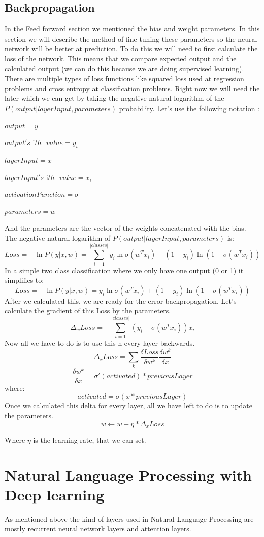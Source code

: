 \subsection{Backpropagation}
In the Feed forward section we mentioned the bias and weight parameters. In this section we will describe the method of fine tuning these parameters so the neural network will be better at prediction.
To do this we will need to first calculate the loss of the network. This means that we compare expected output and the calculated output (we can do this because we are doing supervised learning). There are multiple types of loss functions like squared loss used at regression problems and cross entropy at classification problems. Right now we will need the later which we can get by taking the negative natural logarithm of the \(P(output|layerInput, parameters)\) probability.
Let's use the following notation :

\(output = y\)

\(output's \text{ i}th \text{ } value = y_i\)

\(layerInput = x\)

\(layerInput's \text{ i}th \text{ } value = x_i\)

\(activationFunction = \sigma\)

\(parameters = w\)

And the parameters are the vector of the weights concatenated with the bias.
The negative natural logarithm of \(P(output|layerInput, parameters)\) is:
\[Loss = -\ln P(y|x, w) = \sum_{i=1}^{|classes|}y_i\ln \sigma(w^Tx_i)+(1 - y_i)\ln (1 - \sigma(w^Tx_i))\]
In a simple two class classification where we only have one output (0 or 1) it simplifies to:
\[Loss = -\ln P(y|x, w) = y_i\ln \sigma(w^Tx_i)+(1 - y_i)\ln (1 - \sigma(w^Tx_i))\]
After we calculated this, we are ready for the error backpropagation. Let's calculate the gradient of this Loss by the parameters.
\[\Delta_w Loss = -\sum_{i=1}^{|classes|}(y_i - \sigma(w^Tx_i))x_i\]
Now all we have to do is to use this n every layer backwards.
\[\Delta_x Loss = \sum_{k} \frac{\delta Loss}{\delta w^k}\frac{\delta w^k}{\delta x}\]
\[\frac{\delta w^k}{\delta x} = \sigma'(activated)*previousLayer\]
where:
\[activated = \sigma(x * previousLayer)\]
Once we calculated this delta for every layer, all we have left to do is to update the parameters.
\[w \leftarrow w - \eta * \Delta_x Loss\]

Where \(\eta\) is the learning rate, that we can set.

\section{Natural Language Processing with Deep learning}
As mentioned above the kind of layers used in Natural Language Processing are mostly recurrent neural network layers and attention layers.
